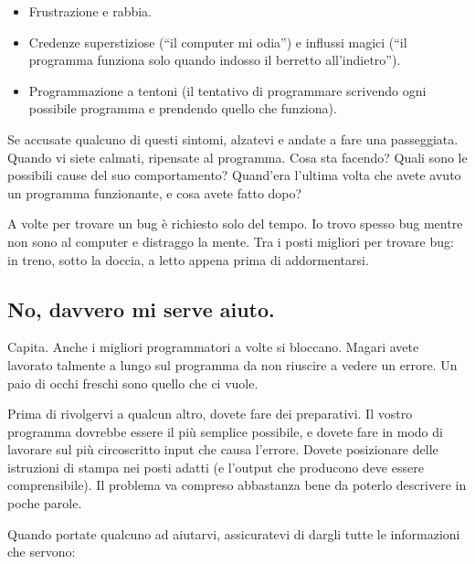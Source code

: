 \documentclass[10pt]{book}
\begin{document}
\begin{itemize}

\item Frustrazione e rabbia.

\item Credenze superstiziose (``il computer mi odia'') e influssi magici (``il programma funziona solo quando indosso il berretto all'indietro'').

\item Programmazione a tentoni (il tentativo di programmare scrivendo ogni possibile programma e prendendo quello che funziona).

\end{itemize}

Se accusate qualcuno di questi sintomi, alzatevi e andate a fare una passeggiata. Quando vi siete calmati, ripensate al programma. Cosa sta facendo? Quali sono le possibili cause del suo comportamento? Quand'era l'ultima volta che avete avuto un programma funzionante, e cosa avete fatto dopo?

A volte per trovare un bug è richiesto solo del tempo. Io trovo spesso bug mentre non sono al computer e distraggo la mente. Tra i posti migliori per trovare bug: in treno, sotto la doccia, a letto appena prima di addormentarsi.


\subsection{No, davvero mi serve aiuto.}

Capita. Anche i migliori programmatori a volte si bloccano. Magari avete lavorato talmente a lungo sul programma da non riuscire a vedere un errore. Un paio di occhi freschi sono quello che ci vuole.

Prima di rivolgervi a qualcun altro, dovete fare dei preparativi. Il vostro programma dovrebbe essere il più semplice possibile, e dovete fare in modo di lavorare sul più circoscritto input che causa l'errore.
Dovete posizionare delle istruzioni di stampa nei posti adatti (e l'output che producono deve essere comprensibile). Il problema va compreso abbastanza bene da poterlo descrivere in poche parole.

Quando portate qualcuno ad aiutarvi, assicuratevi di dargli tutte le informazioni che servono:
\end{document}
